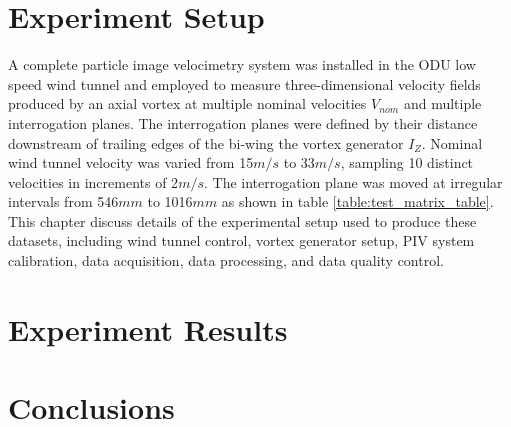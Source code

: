 \documentclass[12pt]{report}
\begin{document}



\chapter{Experiment Setup}
A complete particle image velocimetry system was installed in the ODU low speed 
wind tunnel and employed to measure three-dimensional velocity fields produced 
by an axial vortex at multiple nominal velocities $V_{nom}$ and multiple 
interrogation planes. The interrogation planes were defined by their 
distance downstream of trailing edges of the bi-wing the vortex generator 
$I_Z$. Nominal wind tunnel velocity was varied from 15$m/s$ to 33$m/s$, 
sampling 10 distinct velocities in increments of 2$m/s$. The interrogation 
plane was moved at irregular intervals from 546$mm$ to 1016$mm$ as shown in 
table \ref{table:test_matrix_table}. This chapter discuss details of the 
experimental setup used to produce these datasets, including wind tunnel 
control, vortex generator setup, PIV system calibration, data acquisition, data 
processing, and data quality control.










\chapter{Experiment Results}



\chapter{Conclusions}




\end{document}
